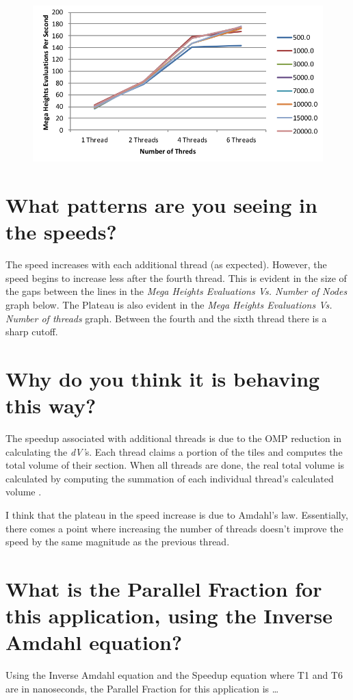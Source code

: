 \documentclass[onecolumn,draftclsnofoot, 10pt, compsoc]{IEEEtran}
\begin{document}
	\begin{figure}[t]
		\includegraphics[width=18cm]{megasVthreads}
		\centering
	\end{figure}
	
	
	\section{What patterns are you seeing in the speeds?}
	The speed increases with each additional thread (as expected). However, the speed begins to increase less after the fourth thread. This is evident in the size of the gaps between the lines in the \textit{Mega Heights Evaluations Vs. Number of Nodes} graph below. The Plateau is also evident in the \textit{Mega Heights Evaluations Vs. Number of threads} graph. Between the fourth and the sixth thread there is a sharp cutoff.
	
	
	
	\section{Why do you think it is behaving this way?}
	The speedup associated with additional threads is due to the OMP reduction in calculating the \textit{dV'}s. Each thread claims a portion of the tiles and computes the total volume of their section. When all threads are done, the real total volume is calculated by computing the summation of each individual thread's calculated volume .
	
	I think that the plateau in the speed increase is due to Amdahl's law. Essentially, there comes a point where increasing the number of threads doesn't improve the speed by the same magnitude as the previous thread.
	
	
	
	
	\section{What is the Parallel Fraction for this application, using the Inverse Amdahl equation?}
	Using the Inverse Amdahl equation and the Speedup equation where T1 and T6 are in nanoseconds, the Parallel Fraction for this application is \dots
	
\end{document}
